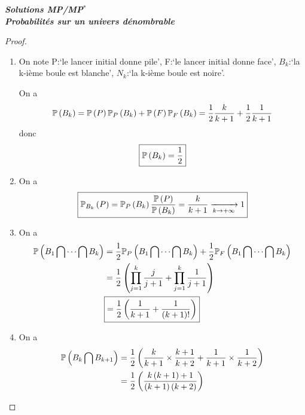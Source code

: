 \documentclass[12pt]{article}
\begin{document}
\begin{titlepage}
	\centering
	\vspace*{\fill}
	\Huge \textit{\textbf{Solutions MP/MP$^*$\\ Probabilités sur un univers dénombrable}}
	\vspace*{\fill}
\end{titlepage}

\begin{proof}
    \phantom{}
    \begin{enumerate}
        \item On note P:`le lancer initial donne pile', F:`le lancer initial donne face', $B_{k}$:`la k-ième boule est blanche', $N_{k}$:`la k-ième boule est noire'.
        
        On a 
        \begin{equation}
            \P\left(B_{k}\right)=\P\left(P\right)\P_{P}\left(B_{k}\right)+\P\left(F\right)\P_{F}\left(B_{k}\right)=\frac{1}{2}\frac{k}{k+1}+\frac{1}{2}\frac{1}{k+1}
        \end{equation}
        donc 
        \begin{equation}
            \boxed{\P\left(B_{k}\right)=\frac{1}{2}}
        \end{equation}

        \item On a 
        \begin{equation}
            \boxed{\P_{B_{k}}\left(P\right)=\P_{P}\left(B_{k}\right)\frac{\P\left(P\right)}{\P\left(B_{k}\right)}=\frac{k}{k+1}\xrightarrow[k\to+\infty]{}1}
        \end{equation}

        \item On a 
        \begin{align}
            \P\left(B_{1}\bigcap\dots\bigcap B_{k}\right)
            &=\frac{1}{2}\P_{P}\left(B_{1}\bigcap\dots\bigcap B_{k}\right)+\frac{1}{2}\P_{F}\left(B_{1}\bigcap\dots\bigcap B_{k}\right)\\
            &=\frac{1}{2}\left(\prod_{j=1}^{k}\frac{j}{j+1}+\prod_{j=1}^{k}\frac{1}{j+1}\right)\\
            &\boxed{=\frac{1}{2}\left(\frac{1}{k+1}+\frac{1}{(k+1)!}\right)}
        \end{align}

        \item On a 
        \begin{align}
            \P\left(B_{k}\bigcap B_{k+1}\right)
            &=\frac{1}{2}\left(\frac{k}{k+1}\times\frac{k+1}{k+2}+\frac{1}{k+1}\times\frac{1}{k+2}\right)\\
            &=\frac{1}{2}\left(\frac{k\left(k+1\right)+1}{\left(k+1\right)\left(k+2\right)}\right)
        \end{align}


\end{enumerate}
\end{proof}
\end{document}
